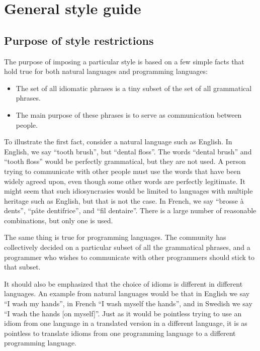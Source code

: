 \chapter{General \commonlisp{} style guide}
\label{chap-general-commonlisp-style-guide}

\section{Purpose of style restrictions}

The purpose of imposing a particular style is based on a few simple
facts that hold true for both natural languages and programming
languages:

\begin{itemize}
\item The set of all idiomatic phrases is a tiny subset of the set of
  all grammatical phrases.
\item The main purpose of these phrases is to serve as communication
  between people.
\end{itemize}

To illustrate the first fact, consider a natural language such as
English.  In English, we say ``tooth brush'', but ``dental floss''.
The words ``dental brush'' and ``tooth floss'' would be perfectly
grammatical, but they are not used.  A person trying to communicate
with other people must use the words that have been widely agreed
upon, even though some other words are perfectly legitimate.  It might
seem that such idiosyncrasies would be limited to languages with
multiple heritage such as English, but that is not the case.  In
French, we say ``brosse à dents'', ``pâte dentifrice'', and ``fil
dentaire''.  There is a large number of reasonable combinations, but
only one is used.

The same thing is true for programming languages.  The community has
collectively decided on a particular subset of all the grammatical
phrases, and a programmer who wishes to communicate with other
programmers should stick to that subset.

It should also be emphasized that the choice of idioms is different in
different languages.  An example from natural languages would be that
in English we say ``I wash my hands'', in French ``I wash myself the
hands'', and in Swedish we say ``I wash the hands [on myself]''.  Just
as it would be pointless trying to use an idiom from one language in a
translated version in a different language, it is as pointless to
translate idioms from one programming language to a different
programming language.

